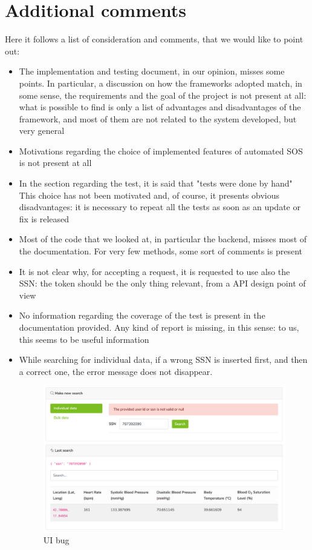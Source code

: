 \section{Additional comments}
Here it follows a list of consideration and comments, that we would like to point out:
\begin{itemize}
\item The implementation and testing document, in our opinion, misses some points. 
In particular, a discussion on how the frameworks adopted match, in some sense, the requirements and the goal of the project 
is not present at all: what is possible to find is only a list of advantages and disadvantages of the framework, and most of them are not
related to the system developed, but very general
\item Motivations regarding the choice of implemented features of automated SOS is not present at all
\item In the section regarding the test, it is said that "tests were done by hand"
This choice has not been motivated and, of course, it presents obvious disadvantages: it is necessary to repeat all the tests as soon as
an update or fix is released
\item Most of the code that we looked at, in particular the backend, misses most of the documentation. For very few methods, some sort
of comments is present
\item It is not clear why, for accepting a request, it is requested to use also the SSN: the token should be the only thing relevant, from a
API design point of view
\item No information regarding the coverage of the test is present in the documentation provided. 
Any kind of report is missing, in this sense: to us, this seems to be useful information
\item While searching for individual data, if a wrong SSN is inserted first, and then 
a correct one, the error message does not disappear. 

\begin{figure}[H]
\includegraphics[width=\linewidth]{images/individualCorrectSsn2}
\caption{ UI bug }
\label{fig:bug1}
\end{figure}


\end{itemize}
